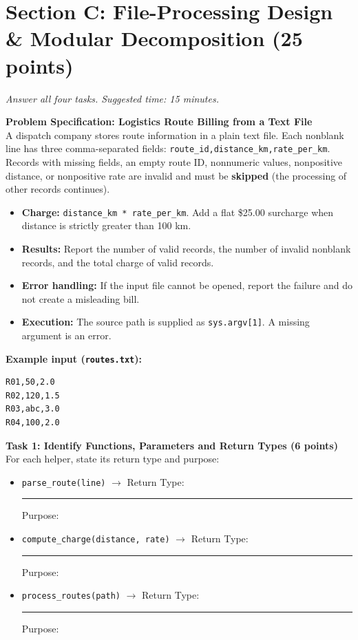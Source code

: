 \documentclass[11pt,a4paper]{article}
\begin{document}
\section*{Section C: File-Processing Design \& Modular Decomposition \hfill \normalsize\normalfont(25 points)}
\textit{Answer all four tasks. Suggested time: 15 minutes.}
\begin{tcolorbox}[colback=boxbg,colframe=secondaryteal,arc=1.5mm,boxrule=0.6pt,top=1.5mm,bottom=1.5mm]
\textbf{Problem Specification: Logistics Route Billing from a Text File}\\[0.5mm]
\small
A dispatch company stores route information in a plain text file. Each nonblank line has three comma-separated fields: \texttt{route\_id,distance\_km,rate\_per\_km}. Records with missing fields, an empty route ID, nonnumeric values, nonpositive distance, or nonpositive rate are invalid and must be \textbf{skipped} (the processing of other records continues).
\begin{itemize}
\item \textbf{Charge:} \texttt{distance\_km * rate\_per\_km}. Add a flat \$25.00 surcharge when distance is strictly greater than 100 km.
\item \textbf{Results:} Report the number of valid records, the number of invalid nonblank records, and the total charge of valid records.
\item \textbf{Error handling:} If the input file cannot be opened, report the failure and do not create a misleading bill.
\item \textbf{Execution:} The source path is supplied as \texttt{sys.argv[1]}. A missing argument is an error.
\end{itemize}
\textbf{Example input (\texttt{routes.txt}):}\\[-0.1em]
\begin{lstlisting}
R01,50,2.0
R02,120,1.5
R03,abc,3.0
R04,100,2.0
\end{lstlisting}
\end{tcolorbox}
\vspace{0.5mm}
\textbf{Task 1: Identify Functions, Parameters and Return Types (6 points)}
For each helper, state its return type and purpose:
\begin{itemize}[leftmargin=1.8em,itemsep=2.5pt]
\item \texttt{parse\_route(line)} $\rightarrow$ Return Type: \rule{2cm}{0.4pt} \quad Purpose: \dotfill
\item \texttt{compute\_charge(distance, rate)} $\rightarrow$ Return Type: \rule{2cm}{0.4pt} \quad Purpose: \dotfill
\item \texttt{process\_routes(path)} $\rightarrow$ Return Type: \rule{2cm}{0.4pt} \quad Purpose: \dotfill
\end{itemize}
\end{document}
